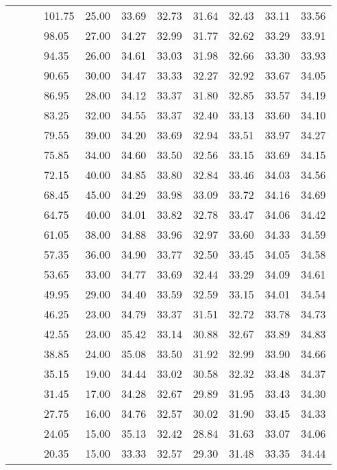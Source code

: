 \begin{longtable}{llllrrrrrrr}
   &  &  & 101.75 & 25.00 & 33.69 & 32.73 & 31.64 & 32.43 & 33.11 & 33.56 \\ 
   &  &  & 98.05 & 27.00 & 34.27 & 32.99 & 31.77 & 32.62 & 33.29 & 33.91 \\ 
   &  &  & 94.35 & 26.00 & 34.61 & 33.03 & 31.98 & 32.66 & 33.30 & 33.93 \\ 
   &  &  & 90.65 & 30.00 & 34.47 & 33.33 & 32.27 & 32.92 & 33.67 & 34.05 \\ 
   &  &  & 86.95 & 28.00 & 34.12 & 33.37 & 31.80 & 32.85 & 33.57 & 34.19 \\ 
   &  &  & 83.25 & 32.00 & 34.55 & 33.37 & 32.40 & 33.13 & 33.60 & 34.10 \\ 
   &  &  & 79.55 & 39.00 & 34.20 & 33.69 & 32.94 & 33.51 & 33.97 & 34.27 \\ 
   &  &  & 75.85 & 34.00 & 34.60 & 33.50 & 32.56 & 33.15 & 33.69 & 34.15 \\ 
   &  &  & 72.15 & 40.00 & 34.85 & 33.80 & 32.84 & 33.46 & 34.03 & 34.56 \\ 
   &  &  & 68.45 & 45.00 & 34.29 & 33.98 & 33.09 & 33.72 & 34.16 & 34.69 \\ 
   &  &  & 64.75 & 40.00 & 34.01 & 33.82 & 32.78 & 33.47 & 34.06 & 34.42 \\ 
   &  &  & 61.05 & 38.00 & 34.88 & 33.96 & 32.97 & 33.60 & 34.33 & 34.59 \\ 
   &  &  & 57.35 & 36.00 & 34.90 & 33.77 & 32.50 & 33.45 & 34.05 & 34.58 \\ 
   &  &  & 53.65 & 33.00 & 34.77 & 33.69 & 32.44 & 33.29 & 34.09 & 34.61 \\ 
   &  &  & 49.95 & 29.00 & 34.40 & 33.59 & 32.59 & 33.15 & 34.01 & 34.54 \\ 
   &  &  & 46.25 & 23.00 & 34.79 & 33.37 & 31.51 & 32.72 & 33.78 & 34.73 \\ 
   &  &  & 42.55 & 23.00 & 35.42 & 33.14 & 30.88 & 32.67 & 33.89 & 34.83 \\ 
   &  &  & 38.85 & 24.00 & 35.08 & 33.50 & 31.92 & 32.99 & 33.90 & 34.66 \\ 
   &  &  & 35.15 & 19.00 & 34.44 & 33.02 & 30.58 & 32.32 & 33.48 & 34.37 \\ 
   &  &  & 31.45 & 17.00 & 34.28 & 32.67 & 29.89 & 31.95 & 33.43 & 34.30 \\ 
   &  &  & 27.75 & 16.00 & 34.76 & 32.57 & 30.02 & 31.90 & 33.45 & 34.33 \\ 
   &  &  & 24.05 & 15.00 & 35.13 & 32.42 & 28.84 & 31.63 & 33.07 & 34.06 \\ 
   &  &  & 20.35 & 15.00 & 33.33 & 32.57 & 29.30 & 31.48 & 33.35 & 34.44 \\ 

\end{longtable}
